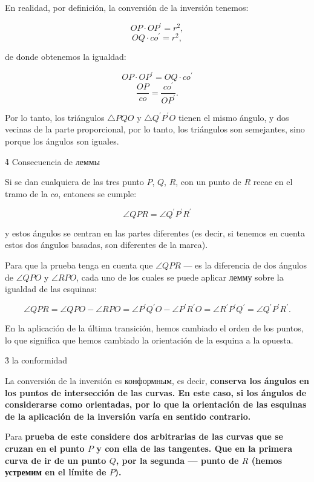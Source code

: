 
En realidad, por definición, la conversión de la inversión tenemos:

$$ OP \cdot OP^\prime = r^2, $$
$$ OQ \cdot co^\prime = r^2, $$

de donde obtenemos la igualdad:

$$ OP \cdot OP^\prime = OQ \cdot co^\prime $$
$$ \frac{ OP }{ co } = \frac{ co^\prime }{ OP^\prime }. $$

Por lo tanto, los triángulos $\triangle PQO$ y $\triangle Q^\prime P^\prime O$ tienen el mismo ángulo, y dos vecinas de la parte proporcional, por lo tanto, los triángulos son semejantes, sino porque los ángulos son iguales.

\h4{ Consecuencia de леммы }

Si se dan cualquiera de las tres punto $P$, $Q$, $R$, con un punto de $R$ recae en el tramo de la $co$, entonces se cumple:

$$ \angle QPR = \angle Q^\prime P^\prime R^\prime $$

y estos ángulos se centran en las partes diferentes (es decir, si tenemos en cuenta estos dos ángulos basadas, son diferentes de la marca).


Para que la prueba tenga en cuenta que $\angle QPR$ --- es la diferencia de dos ángulos de $\angle QPO$ y $\angle RPO$, cada uno de los cuales se puede aplicar лемму sobre la igualdad de las esquinas:

$$ \angle QPR = \angle QPO - \angle RPO = \angle P^\prime Q^\prime O - \angle P^\prime R^\prime O = \angle R^\prime P^\prime Q^\prime = \angle Q^\prime P^\prime R^\prime. $$

En la aplicación de la última transición, hemos cambiado el orden de los puntos, lo que significa que hemos cambiado la orientación de la esquina a la opuesta.


\h3{ la conformidad }

La conversión de la inversión es конформным, es decir, \bf{conserva los ángulos en los puntos de intersección de las curvas}. En este caso, si los ángulos de considerarse como orientadas, por lo que la orientación de las esquinas de la aplicación de la inversión varía en sentido contrario.


Para \bf{prueba} de este considere dos arbitrarias de las curvas que se cruzan en el punto $P$ y con ella de las tangentes. Que en la primera curva de ir de un punto $Q$, por la segunda --- punto de $R$ (hemos устремим en el límite de $P$).

